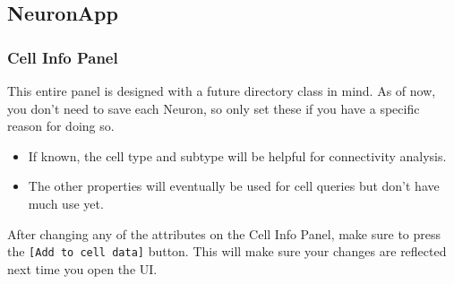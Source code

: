 \documentclass[11pt]{beamer}
\begin{document}
\subsection*{NeuronApp}
	\begin{frame}
		\frametitle{Cell Info Panel}
		This entire panel is designed with a future directory class in mind. As of now, you don't need to save each Neuron, so only set these if you have a specific reason for doing so.
		\begin{itemize}
			\item If known, the cell type and subtype will be helpful for connectivity analysis.
			\item The other properties will eventually be used for cell queries but don't have much use yet.
		\end{itemize}
			After changing any of the attributes on the Cell Info Panel, make sure to press the \texttt{[Add to cell data]} button. This will make sure your changes are reflected next time you open the UI.\\
	\end{frame}
\end{document}

